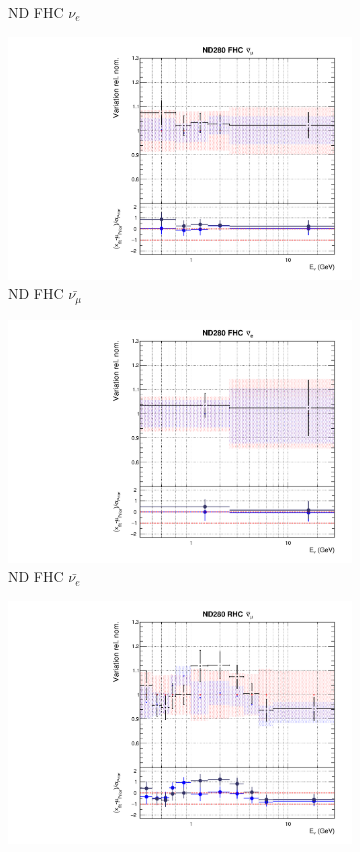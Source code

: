\begin{figure}[t]
\begin{subfigure}{0.24\textwidth}
  \caption{ND FHC $\nu_{e}$}
\end{subfigure}
\begin{subfigure}{0.24\textwidth}
  \centering
  \includegraphics[width=0.95\linewidth]{figs/rhcmpdat28flux_2}
  \caption{ND FHC $\bar{\nu_{\mu}}$}
\end{subfigure}
\begin{subfigure}{0.24\textwidth}
  \centering
  \includegraphics[width=0.95\linewidth]{figs/rhcmpdat28flux_3}
  \caption{ND FHC $\bar{\nu_{e}}$}
\end{subfigure}
\begin{subfigure}{0.24\textwidth}
  \centering
  \includegraphics[width=0.95\linewidth]{figs/rhcmpdat28flux_4}

\end{subfigure}
\end{figure}
